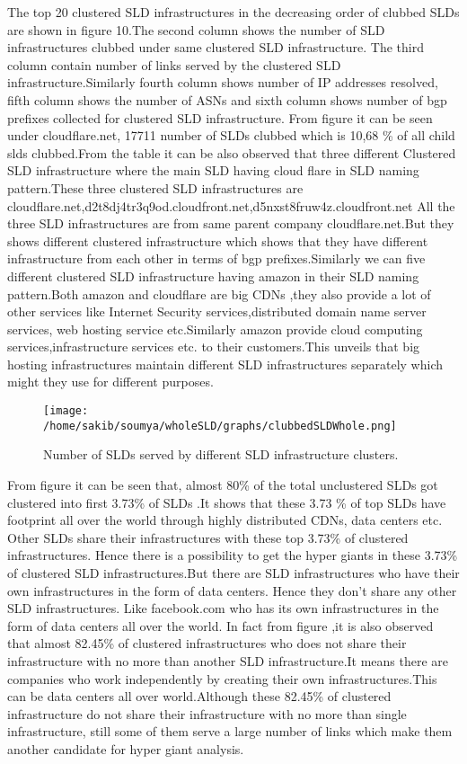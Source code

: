 The top 20 clustered SLD infrastructures in the decreasing order of clubbed SLDs are shown in figure 10.The second column shows the number of SLD infrastructures clubbed under same clustered SLD infrastructure. The third column contain number of links served by the clustered SLD infrastructure.Similarly fourth column shows number of IP addresses resolved, fifth column shows the number of ASNs  and sixth column shows number of bgp prefixes collected for clustered SLD infrastructure. From figure it can be seen under cloudflare.net, 17711 number of SLDs clubbed which is  10,68 \% of all child slds clubbed.From the table it can be also observed that three different Clustered SLD infrastructure where the main SLD having cloud flare in SLD naming pattern.These three clustered SLD infrastructures are cloudflare.net,d2t8dj4tr3q9od.cloudfront.net,d5nxst8fruw4z.cloudfront.net
All the three SLD infrastructures are from same parent company cloudflare.net.But they shows different clustered infrastructure which shows that they have different infrastructure from each other in terms of bgp prefixes.Similarly we can five different clustered SLD infrastructure having amazon in their SLD naming pattern.Both amazon and cloudflare are big CDNs ,they also provide a lot of other services like  Internet Security services,distributed domain name server services, web hosting service etc.Similarly amazon provide cloud computing services,infrastructure services etc. to their customers.This unveils that big hosting infrastructures maintain different SLD infrastructures separately which might they use for different purposes. 

\begin{figure}[h]
\texttt{[image: /home/sakib/soumya/wholeSLD/graphs/clubbedSLDWhole.png]}
\centering
\caption{Number of SLDs served by different SLD infrastructure clusters.}
\end{figure}

From figure it can be seen that, almost 80\% of the total unclustered SLDs got clustered into first 3.73\% of SLDs .It shows that these 3.73 \% of top SLDs have footprint all over the world through highly distributed CDNs, data centers etc. Other SLDs share their infrastructures with these top 3.73\% of clustered infrastructures. Hence there is a possibility to get the hyper giants in these 3.73\% of clustered SLD infrastructures.But there are SLD infrastructures who have their own infrastructures in the form of data centers. Hence they don't share any other SLD infrastructures. Like facebook.com who has its own infrastructures in the form of data centers all over the world. In fact from figure ,it is also observed that almost 82.45\% of clustered infrastructures who does not share their infrastructure with no more than another SLD infrastructure.It means there are companies who work independently by creating their own infrastructures.This can be data centers all over world.Although these 82.45\% of clustered infrastructure do not share their infrastructure with no more than single infrastructure, still some of them serve a large number of links which make them another candidate for hyper giant analysis.

